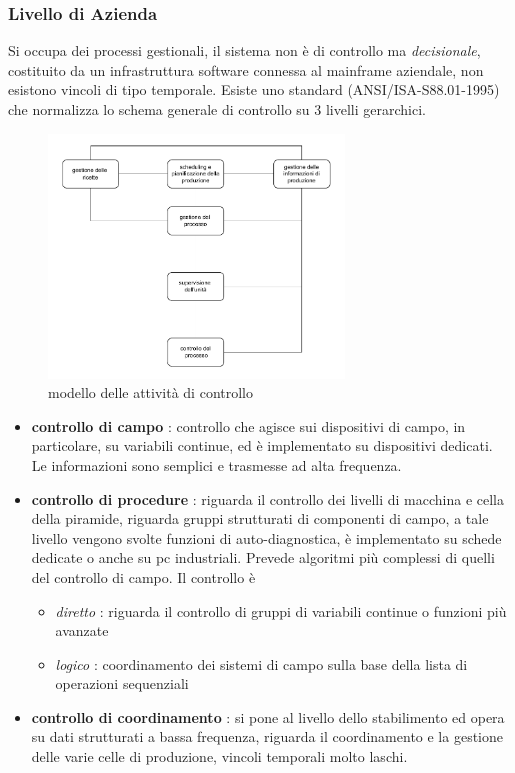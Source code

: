 \documentclass[10pt, letterpaper]{report}
\begin{document}
\subsubsection{Livello di Azienda}
Si occupa dei processi gestionali, il sistema non è di controllo ma \textit{decisionale}, costituito da un 
infrastruttura software connessa al mainframe aziendale, non esistono vincoli di tipo temporale.\acc 
Esiste uno standard (ANSI/ISA-S88.01-1995) che normalizza lo schema generale di controllo su 3 livelli gerarchici.
\begin{figure}[h!]
    \centering
    \includegraphics[width=0.7\textwidth ]{images/standardControlModel.pdf}
    \caption{modello delle attività di controllo}
\end{figure}
\begin{itemize}
    \item \textbf{controllo di campo} : controllo che agisce sui dispositivi di campo, in particolare, 
    su variabili continue, ed è implementato  su dispositivi dedicati. Le informazioni sono semplici 
    e trasmesse ad alta frequenza. 
    \item \textbf{controllo di procedure} : riguarda il controllo dei livelli di macchina e cella della 
    piramide, riguarda gruppi strutturati di componenti di campo, a tale livello vengono svolte funzioni di 
    auto-diagnostica, è implementato su schede dedicate o anche su pc industriali. Prevede 
    algoritmi più complessi di quelli del controllo di campo. Il controllo è \begin{itemize}
        \item \textit{diretto} : riguarda il controllo di 
        gruppi di variabili continue o funzioni più avanzate 
        \item \textit{logico} : coordinamento dei sistemi di campo sulla base della lista 
        di operazioni sequenziali
    \end{itemize}
    \item \textbf{controllo di coordinamento} : si pone al livello dello stabilimento ed opera su dati 
    strutturati a bassa frequenza, riguarda il coordinamento e la gestione delle varie celle di produzione, vincoli 
    temporali molto laschi.
\end{itemize}
\end{document}
